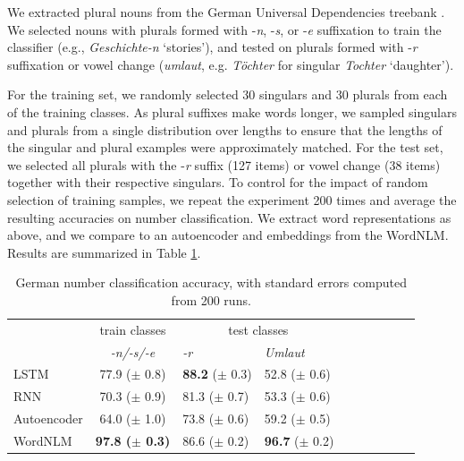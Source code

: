We extracted plural nouns from the German Universal Dependencies
treebank \cite{de2006generating,mcdonald2013universal}.  We selected
nouns with plurals formed with -\emph{n}, -\emph{s}, or -\emph{e}
suffixation to train the classifier (e.g., \emph{Geschichte-n} `stories'), and tested on plurals formed with
-\emph{r} suffixation or vowel change (\emph{umlaut}, e.g. \emph{T{\"o}chter} for singular \emph{Tochter} `daughter').

For the training set, we randomly selected 30 singulars and 30 plurals
from each of the training classes.  As plural suffixes make words
longer, we sampled singulars and plurals %
from a
single distribution over lengths to ensure that the lengths of the
singular and plural examples were approximately matched.  For the test
set, we selected all plurals with the -\emph{r} suffix (127 items) or vowel change (38 items)
together with their respective singulars. %
To
control for the impact of random selection of training samples, we
repeat the experiment 200 times and average the resulting accuracies
on number classification.  We extract word representations as above,
and we compare to an autoencoder and embeddings from the WordNLM.
Results are summarized in Table \ref{tab:number-results}.



\begin{table}[t]
	\footnotesize
  \begin{center}
    \begin{tabular}{l|c|l|lllllll}
      &train classes&\multicolumn{2}{c}{test classes}\\
      &\emph{-n/-s/-e}&\emph{-r}&\emph{Umlaut}\\      \hline
	    LSTM& 77.9 ($\pm$ 0.8) & \textbf{88.2} ($\pm$ 0.3) & 52.8 ($\pm$ 0.6) \\
	    RNN& 70.3 ($\pm$ 0.9) & 81.3 ($\pm$ 0.7) & 53.3 ($\pm$ 0.6)\\
	    Autoencoder& 64.0 ($\pm$ 1.0) & 73.8 ($\pm$ 0.6) & 59.2 ($\pm$ 0.5)\\
	    WordNLM& \textbf{97.8 ($\pm$ 0.3)} & 86.6 ($\pm$ 0.2) & \textbf{96.7} ($\pm$ 0.2)  \\ %
    \end{tabular}
  \end{center}
	\caption{\label{tab:number-results} German number classification accuracy, with standard errors computed from 200 runs.}
\end{table}





